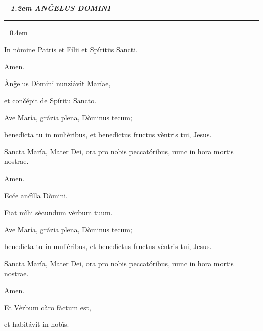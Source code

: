 \documentclass[twoside,10pt]{article}
\begin{document}
\pagestyle{empty}
{
  \begin{center}
  {\bfseries\itshape\large{}\font=1.2em \uppercase{anǧelus domini}}
  \end{center}
}

{
  \begin{center}
  \rule{20em}{0.4pt}
  \end{center}
}

{
  \setlength\parindent{2em}\font=0.4em

  \bigskip

  \noindent In nòmine Patris et Fílii et Spíritüs Sancti.
  
  Amen.

  \bigskip

   Ànǧelus Dòmini nunziávit Maríae,

  \smallskip

   et cončépit de Spíritu Sancto.

  \bigskip

  \noindent Ave María, grázia plena, Dòminus tecum;
  
  benedìcta tu in mulièribus, et benedìctus fructus vèntris tui, Jesus.

  Sancta María, Mater Dei, ora pro nobis peccatóribus, nunc in hora mortis nostrae.

  Amen.

  \bigskip

   Ecče ančìlla Dòmini.

  \smallskip

   Fiat mìhi sècundum vèrbum tuum.

  \bigskip

  \noindent Ave María, grázia plena, Dòminus tecum;
  
  benedìcta tu in mulièribus, et benedìctus fructus vèntris tui, Jesus.

  Sancta María, Mater Dei, ora pro nobis peccatóribus, nunc in hora mortis nostrae.

  Amen.

  \bigskip

   Et Vèrbum càro fàctum est,

  \smallskip

   et habitávit in nobïs.

  \bigskip

}
\end{document}
